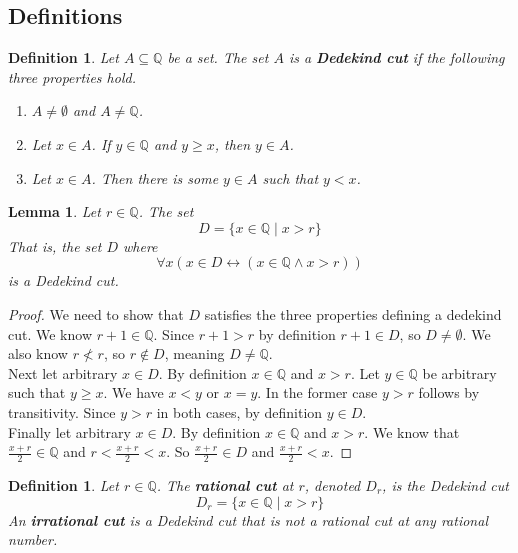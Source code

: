 \documentclass{report}
\newtheorem{lemma}[theo]{Lemma}
\newtheorem{definition}[theo]{Definition}
\begin{document}
\subsection{Definitions}
\begin{definition}
Let $A\subseteq\mathbb Q$ be a set. The set $A$ is a \textbf{Dedekind cut} if the following three properties hold.
\begin{enumerate}
\item $A\neq\emptyset$ and $A\neq\mathbb Q$.
\item Let $x\in A$. If $y\in\mathbb Q$ and $y\geq x$, then $y\in A$.
\item Let $x\in A$. Then there is some $y\in A$ such that $y<x$.
\end{enumerate}
\end{definition}
\begin{lemma}
Let $r\in\mathbb Q$. The set 
\begin{equation*}
D=\{x\in\mathbb Q\mid x>r\}
\end{equation*}
That is, the set $D$ where
\begin{equation*}
\forall x(x\in D\leftrightarrow(x\in\mathbb Q\land x>r))
\end{equation*}
is a Dedekind cut.
\end{lemma}
\begin{proof}
We need to show that $D$ satisfies the three properties defining a dedekind cut.
We know $r+1\in\mathbb Q$. Since $r+1>r$ by definition $r+1\in D$, so $D\neq\emptyset$.
We also know $r\nless r$, so $r\notin D$, meaning $D\neq\mathbb Q$.\\
\indent Next let arbitrary $x\in D$. By definition $x\in\mathbb Q$ and $x>r$. Let $y\in\mathbb Q$ be arbitrary such that $y\geq x$.
We have $x<y$ or $x=y$. In the former case $y>r$ follows by transitivity. Since $y>r$ in both cases, by definition $y\in D$.\\
\indent Finally let arbitrary $x\in D$. By definition $x\in\mathbb Q$ and $x>r$. We know that $\frac{x+r}{2}\in\mathbb Q$ and $r<\frac{x+r}{2}<x$. So $\frac{x+r}{2}\in D$ and $\frac{x+r}{2}<x$.
\end{proof}
\begin{definition}
Let $r\in\mathbb Q$. The \textbf{rational cut} at $r$, denoted $D_r$, is the Dedekind cut
\begin{equation*}
D_r=\{x\in\mathbb Q\mid x>r\}
\end{equation*}
An \textbf{irrational cut} is a Dedekind cut that is not a rational cut at any rational number.
\end{definition}
\end{document}
